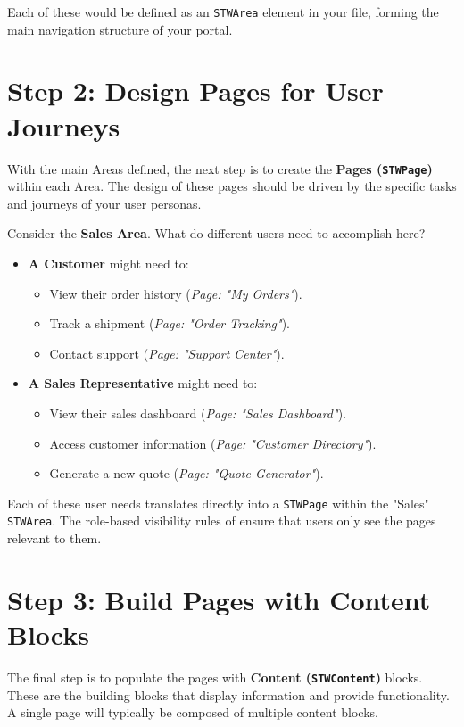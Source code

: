Each of these would be defined as an \texttt{STWArea} element in your \wbdl{} file, forming the main navigation structure of your portal.

\section{Step 2: Design Pages for User Journeys}
\label{sec:design-pages}

With the main Areas defined, the next step is to create the \textbf{Pages (\texttt{STWPage})} within each Area. The design of these pages should be driven by the specific tasks and journeys of your user personas.

Consider the \textbf{Sales Area}. What do different users need to accomplish here?
\begin{itemize}
    \item \textbf{A Customer} might need to:
        \begin{itemize}
            \item View their order history (\textit{Page: "My Orders"}).
            \item Track a shipment (\textit{Page: "Order Tracking"}).
            \item Contact support (\textit{Page: "Support Center"}).
        \end{itemize}
    \item \textbf{A Sales Representative} might need to:
        \begin{itemize}
            \item View their sales dashboard (\textit{Page: "Sales Dashboard"}).
            \item Access customer information (\textit{Page: "Customer Directory"}).
            \item Generate a new quote (\textit{Page: "Quote Generator"}).
        \end{itemize}
\end{itemize}

Each of these user needs translates directly into a \texttt{STWPage} within the "Sales" \texttt{STWArea}. The role-based visibility rules of \wbdl{} ensure that users only see the pages relevant to them.

\section{Step 3: Build Pages with Content Blocks}
\label{sec:build-with-content}

The final step is to populate the pages with \textbf{Content (\texttt{STWContent})} blocks. These are the building blocks that display information and provide functionality. A single page will typically be composed of multiple content blocks.

